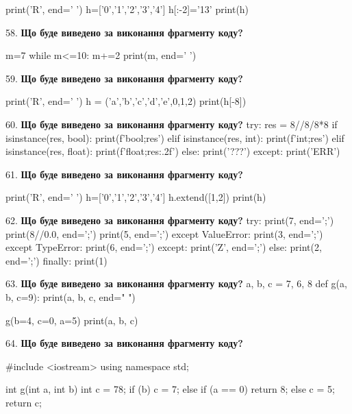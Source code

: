 \documentclass[11pt]{article}
\begin{document}
print('R', end=' ')
h=['0','1','2','3','4']
h[:-2]='13'
print(h)

\par\vspace{5mm}
58. \textbf{Що буде виведено за виконання фрагменту коду?}

m=7
while m<=10:
    m+=2
print(m, end=' ')

\par\vspace{5mm}
59. \textbf{Що буде виведено за виконання фрагменту коду?}

print('R', end=' ')
h = ('a','b','c','d','e',0,1,2)
print(h[-8])

\par\vspace{5mm}
60. \textbf{Що буде виведено за виконання фрагменту коду?}
try:
    res = 8//8/8*8
    if isinstance(res, bool):
        print(f'bool;{res}')
    elif isinstance(res, int):
        print(f'int;{res}')
    elif isinstance(res, float):
        print(f'float;{res:.2f}')
    else:
        print('???')
except:
    print('ERR')
\par\vspace{5mm}
61. \textbf{Що буде виведено за виконання фрагменту коду?}

print('R', end=' ')
h=['0','1','2','3','4']
h.extend([1,2])
print(h)

\par\vspace{5mm}
62. \textbf{Що буде виведено за виконання фрагменту коду?}
try:
    print(7, end=';')
    print(8//0.0, end=';')
    print(5, end=';')
except ValueError:
    print(3, end=';')
except TypeError:
    print(6, end=';')
except:
    print('Z', end=';')
else:
    print(2, end=';')
finally:
    print(1)
\par\vspace{5mm}
63. \textbf{Що буде виведено за виконання фрагменту коду?}
a, b, c = 7, 6, 8
def g(a, b, c=9):
    print(a, b, c, end=" ")

g(b=4, c=0, a=5)
print(a, b, c)
\par\vspace{5mm}
64. \textbf{Що буде виведено за виконання фрагменту коду?}

#include <iostream>
using namespace std;

int g(int a, int b){
    int c = 78;
    if (b)
        c = 7;
    else if (a == 0)
         return 8;
    else 
        c = 5;
    return c;
}
\end{document}
